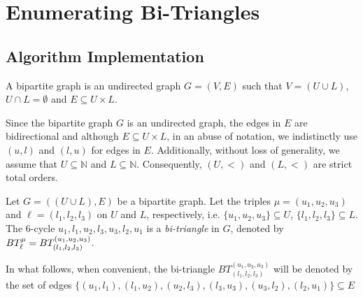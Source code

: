 \chapter{Enumerating Bi-Triangles}
\section{Algorithm Implementation}

\begin{definition} 
A bipartite graph is an undirected graph $G=(V,E)$  such that $V=(U\cup L)$, $U\cap L=\emptyset$ and $E\subseteq U\times L$.\cite{Bondy1976}
\end{definition}

Since the bipartite graph $G$ is an undirected graph, the edges in $E$ are bidirectional and although $E\subseteq U\times L$, in an abuse of notation, we indistinctly use $(u,l)$ and $(l,u)$ for edges in $E$. Additionally, 
without loss of generality, we assume that  $U\subseteq \mathbb{N}$ and $L\subseteq \mathbb{N}$. Consequently, $(U,<)$  and $(L,<)$ are strict total orders. 

%
\begin{definition}[Bi-Triangle]
Let $G=((U\cup L),E)$ be a bipartite graph. Let the triples $\mu=(u_1, u_2, u_3)$ and $\ell=(l_1, l_2,l_3)$ on $U$ and $L$, respectively, i.e.  $\{u_1, u_2, u_3\} \subseteq U$, $\{l_1, l_2,l_3\} \subseteq L$. 
The 6-cycle $u_1,l_1,u_2,l_3,u_3,l_2,u_1$  is a \textit{bi-triangle} in $G$, denoted by $BT_{\ell}^{\mu} = BT_{(l_1, l_2,l_3)}^{(u_1, u_2, u_3)}$. 
\end{definition}

In what follows, when convenient, the bi-triangle $BT_{(l_1,l_2,l_3)}^{(u_1,u_2,u_3)}$  will be denoted by the set of edges $\{(u_1, l_1), (l_1,u_2), (u_2, l_3), (l_3,u_3), (u_3, l_2), (l_2,u_1)\} \subseteq E$

